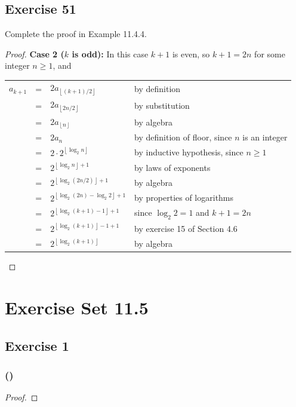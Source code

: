 \documentclass[14pt]{extarticle}
\newcommand{\cy}{\color{cyan}}
\newcommand{\floor}[1]{{\left\lfloor#1\right\rfloor}}
\begin{document}
\subsection{Exercise 51}
Complete the proof in Example 11.4.4.
\begin{proof}
{\bf Case 2 (\(k\) is odd):} In this case \(k+1\) is even, so \(k+1 = 2n\) for some integer \(n \geq 1\), and
\begin{center}
\begin{tabular}{rcll}
\(a_{k+1}\) & = & \(2a_{\floor{(k+1)/2}}\) & {\cy by definition} \\
& = & \(2a_{\floor{2n/2}}\) & {\cy by substitution} \\
& = & \(2a_{\floor{n}}\) & {\cy by algebra} \\
& = & \(2a_n\) & {\cy by definition of floor, since \(n\) is an integer} \\
& = & \(2 \cdot 2^{\floor{\log_2 n}}\) & {\cy by inductive hypothesis, since \(n \geq 1\)} \\
& = & \(2^{\floor{\log_2 n} + 1}\) & {\cy by laws of exponents} \\
& = & \(2^{\floor{\log_2 (2n/2)} + 1}\) & {\cy by algebra} \\
& = & \(2^{\floor{\log_2 (2n) - \log_2 2} + 1}\) & {\cy by properties of logarithms} \\
& = & \(2^{\floor{\log_2 (k+1) - 1} + 1}\) & {\cy since \(\log_2 2 = 1\) and \(k+1 = 2n\)} \\
& = & \(2^{\floor{\log_2 (k+1)} - 1 + 1}\) & {\cy by exercise 15 of Section 4.6} \\
& = & \(2^{\floor{\log_2 (k+1)}}\) & {\cy by algebra}
\end{tabular}
\end{center}
\end{proof}

\section{Exercise Set 11.5}

\subsection{Exercise 1}

\subsubsection{()}

\begin{proof}

\end{proof}
\end{document}
